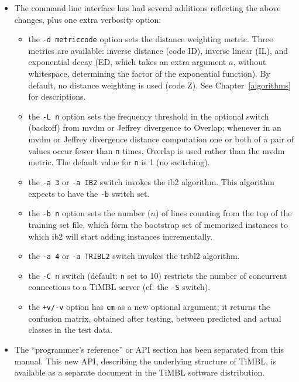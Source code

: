 \documentclass{report}
\begin{document}
\begin{itemize}
\item The command line interface has had several additions reflecting
the above changes, plus one extra verbosity option:

\begin{itemize} 
	\item the {\tt -d metriccode} option sets the distance
          weighting metric. Three metrics are available: inverse
          distance (code ID), inverse linear (IL), and exponential
          decay (ED, which takes an extra argument $a$, without
          whitespace, determining the factor of the exponential
          function). By default, no distance weighting is used (code
          Z). See Chapter~\ref{algorithms} for descriptions.
        \item the {\tt -L n} option sets the frequency threshold in
          the optional switch (backoff) from {\sc mvdm} or Jeffrey
          divergence to Overlap; whenever in an {\sc mvdm} or Jeffrey
          divergence distance computation one or both of a pair of
          values occur fewer than {\tt n} times, Overlap is used
          rather than the {\sc mvdm} metric.  The default value for
          {\tt n} is 1 (no switching).
	\item the {\tt -a 3} or {\tt -a IB2} switch invokes the 
              {\sc ib2} algorithm. This algorithm expects to have 
              the {\tt -b} switch set.
	\item the {\tt -b n} option sets the number ($n$) of lines
              counting from the top of the training set file, which form
              the bootstrap set of memorized instances to which {\sc ib2} 
              will start adding instances incrementally.
	\item the {\tt -a 4} or {\tt -a TRIBL2} switch invokes the 
              {\sc tribl2} algorithm.
        \item the {\tt -C n} switch (default: {\tt n} set to 10) restricts
              the number of concurrent connections to a TiMBL server
              (cf. the {\tt -S} switch).
	\item the {\tt +v/-v} option has {\tt cm} as a new optional
              argument; it returns the confusion matrix, obtained
              after testing, between predicted and actual classes in 
              the test data.
\end{itemize}

\item The ``programmer's reference'' or API section has been separated
  from this manual. This new API, describing the underlying structure
  of TiMBL, is available as a separate document in the TiMBL software
  distribution.


\end{itemize}
\end{document}
